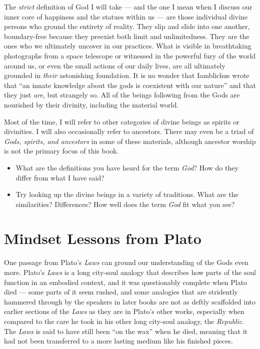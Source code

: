 \documentclass[
]{book}
\begin{document}
The \emph{strict} definition of God I will take --- and the one I mean when I discuss our inner core of happiness and the statues within us --- are those individual divine persons who ground the entirety of reality. They slip and slide into one another, boundary-free because they preexist both limit and unlimitedness. They are the ones who we ultimately uncover in our practices. What is visible in breathtaking photographs from a space telescope or witnessed in the powerful fury of the world around us, or even the small actions of our daily lives, are all ultimately grounded in \emph{their} astonishing foundation. It is no wonder that Iamblichus wrote that ``an innate knowledge about the gods is coexistent with our nature'' and that they just \emph{are}, but strangely so. All of the beings following from the Gods are nourished by their divinity, including the material world.

Most of the time, I will refer to other categories of divine beings as spirits or divinities. I will also occasionally refer to ancestors. There may even be a triad of \emph{Gods, spirits, and ancestors} in some of these materials, although ancestor worship is not the primary focus of this book.

\begin{itemize}
\item
  What are the definitions you have heard for the term \emph{God}? How do they differ from what I have said?
\item
  Try looking up the divine beings in a variety of traditions. What are the similarities? Differences? How well does the term \emph{God} fit what you see?
\end{itemize}

\hypertarget{mindset-lessons-from-plato}{%
\section{Mindset Lessons from Plato}\label{mindset-lessons-from-plato}}

One passage from Plato's \emph{Laws} can ground our understanding of the Gods even more. Plato's \emph{Laws} is a long city-soul analogy that describes how parts of the soul function in an embodied context, and it was questionably complete when Plato died --- some parts of it seem rushed, and some analogies that are stridently hammered through by the speakers in later books are not as deftly scaffolded into earlier sections of the \emph{Laws} as they are in Plato's other works, especially when compared to the care he took in his other long city-soul analogy, the \emph{Republic}. The \emph{Laws} is said to have still been ``on the wax'' when he died, meaning that it had not been transferred to a more lasting medium like his finished pieces.
\end{document}
